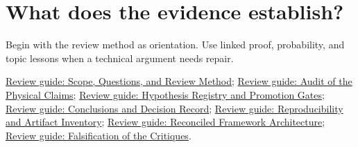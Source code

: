 \section*{What does the evidence establish?}

Begin with the review method as orientation. Use linked proof, probability, and topic lessons when a technical argument needs repair.

\href{https://github.com/Oichkatzelesfrettschen/MathScienceCompendium/blob/main/docs/learning/lessons/review_evidence.md}{Review guide: Scope, Questions, and Review Method}; \href{https://github.com/Oichkatzelesfrettschen/MathScienceCompendium/blob/main/docs/learning/lessons/review_physical.md}{Review guide: Audit of the Physical Claims}; \href{https://github.com/Oichkatzelesfrettschen/MathScienceCompendium/blob/main/docs/learning/lessons/review_hypotheses.md}{Review guide: Hypothesis Registry and Promotion Gates}; \href{https://github.com/Oichkatzelesfrettschen/MathScienceCompendium/blob/main/docs/learning/lessons/review_conclusions.md}{Review guide: Conclusions and Decision Record}; \href{https://github.com/Oichkatzelesfrettschen/MathScienceCompendium/blob/main/docs/learning/lessons/review_reproduction.md}{Review guide: Reproducibility and Artifact Inventory}; \href{https://github.com/Oichkatzelesfrettschen/MathScienceCompendium/blob/main/docs/learning/lessons/review_framework.md}{Review guide: Reconciled Framework Architecture}; \href{https://github.com/Oichkatzelesfrettschen/MathScienceCompendium/blob/main/docs/learning/lessons/review_critique.md}{Review guide: Falsification of the Critiques}.
